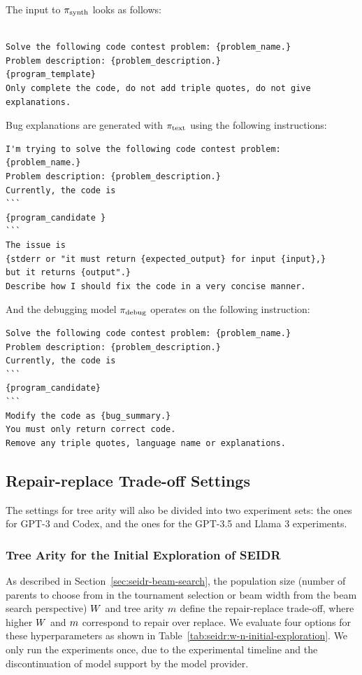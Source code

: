 The input to $ \pi_\text{synth} $ looks as follows: 
\begin{lstlisting}

Solve the following code contest problem: {problem_name.}
Problem description: {problem_description.}
{program_template}
Only complete the code, do not add triple quotes, do not give explanations.
\end{lstlisting}

Bug explanations are generated with $ \pi_\text{text} $ using the following instructions:
\begin{lstlisting}
I'm trying to solve the following code contest problem: {problem_name.}
Problem description: {problem_description.}
Currently, the code is
```
{program_candidate }
```
The issue is 
{stderr or "it must return {expected_output} for input {input},} 
but it returns {output".}
Describe how I should fix the code in a very concise manner. 
\end{lstlisting}

And the debugging model $ \pi_\text{debug} $ operates on the following instruction:
\begin{lstlisting}
Solve the following code contest problem: {problem_name.} 
Problem description: {problem_description.} 
Currently, the code is  
```
{program_candidate} 
```
Modify the code as {bug_summary.} 
You must only return correct code.  
Remove any triple quotes, language name or explanations.
\end{lstlisting}



\subsection{Repair-replace Trade-off Settings}
\label{sec:seidr-trade-off-settings}

The settings for tree arity will also be divided into two experiment sets: the ones for GPT-3 and Codex, and the ones for the GPT-3.5 and Llama 3 experiments.

\subsubsection{Tree Arity for the Initial Exploration of SEIDR}
\label{sec:seidr-tree arity-gpt-3}
As described in Section~\ref{sec:seidr-beam-search}, the population size (number of parents to choose from in the tournament selection or beam width from the beam search perspective) $W{}$ and tree arity $m{}$ define the repair-replace trade-off, where higher $W{}$ and $m{}$ correspond to repair over replace. 
We evaluate four options for these hyperparameters as shown in Table~\ref{tab:seidr:w-n-initial-exploration}. 
We only run the experiments once, due to the experimental timeline and the discontinuation of model support by the model provider. 


